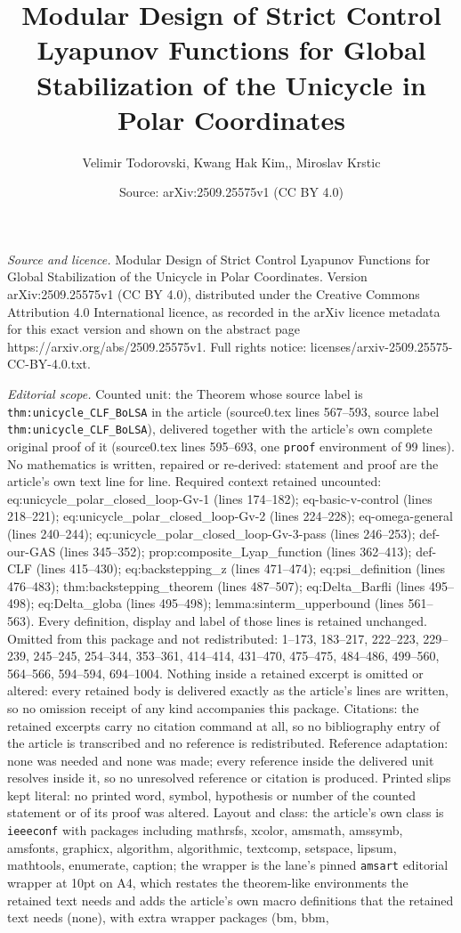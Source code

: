 \documentclass[10pt,a4paper]{amsart}
\title[Modular Design of Strict Control Lyapunov Functions for Glob]{Modular Design of Strict Control Lyapunov Functions for Global Stabilization of the Unicycle in Polar Coordinates}
\author{Velimir Todorovski, Kwang Hak Kim,, Miroslav Krstic}
\date{Source: arXiv:2509.25575v1 (CC BY 4.0)}
\begin{document}
\maketitle

\noindent\emph{Source and licence.} Modular Design of Strict Control Lyapunov Functions for Global Stabilization of the Unicycle in Polar Coordinates. Version arXiv:2509.25575v1 (CC BY 4.0), distributed under the Creative Commons Attribution 4.0 International licence, as recorded in the arXiv licence metadata for this exact version and shown on the abstract page https://arxiv.org/abs/2509.25575v1. Full rights notice: licenses/arxiv-2509.25575-CC-BY-4.0.txt.\par\smallskip

\noindent\textit{Editorial scope.} Counted unit: the Theorem whose source label is \texttt{thm:unicycle\_CLF\_BoLSA} in the article (source0.tex lines 567--593, source label \texttt{thm:unicycle\_CLF\_BoLSA}), delivered together with the article's own complete original proof of it (source0.tex lines 595--693, one \texttt{proof} environment of 99 lines). No mathematics is written, repaired or re-derived: statement and proof are the article's own text line for line. Required context retained uncounted: eq:unicycle\_polar\_closed\_loop-Gv-1 (lines 174--182); eq-basic-v-control (lines 218--221); eq:unicycle\_polar\_closed\_loop-Gv-2 (lines 224--228); eq-omega-general (lines 240--244); eq:unicycle\_polar\_closed\_loop-Gv-3-pass (lines 246--253); def-our-GAS (lines 345--352); prop:composite\_Lyap\_function (lines 362--413); def-CLF (lines 415--430); eq:backstepping\_z (lines 471--474); eq:psi\_definition (lines 476--483); thm:backstepping\_theorem (lines 487--507); eq:Delta\_Barfli (lines 495--498); eq:Delta\_globa (lines 495--498); lemma:sinterm\_upperbound (lines 561--563). Every definition, display and label of those lines is retained unchanged. Omitted from this package and not redistributed: 1--173, 183--217, 222--223, 229--239, 245--245, 254--344, 353--361, 414--414, 431--470, 475--475, 484--486, 499--560, 564--566, 594--594, 694--1004. Nothing inside a retained excerpt is omitted or altered: every retained body is delivered exactly as the article's lines are written, so no omission receipt of any kind accompanies this package. Citations: the retained excerpts carry no citation command at all, so no bibliography entry of the article is transcribed and no reference is redistributed. Reference adaptation: none was needed and none was made; every reference inside the delivered unit resolves inside it, so no unresolved reference or citation is produced. Printed slips kept literal: no printed word, symbol, hypothesis or number of the counted statement or of its proof was altered. Layout and class: the article's own class is \texttt{ieeeconf} with packages including mathrsfs, xcolor, amsmath, amssymb, amsfonts, graphicx, algorithm, algorithmic, textcomp, setspace, lipsum, mathtools, enumerate, caption; the wrapper is the lane's pinned \texttt{amsart} editorial wrapper at 10pt on A4, which restates the theorem-like environments the retained text needs and adds the article's own macro definitions that the retained text needs (none), with extra wrapper packages (bm, bbm, 
\end{document}
